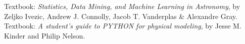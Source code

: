 \documentclass[oneside,a4paper,12pt]{article}
\begin{document}
	\begin{thebibliography}{}
	\bibitem{}
	\noindent Textbook: \emph{Statistics, Data Mining, and Machine Learning in Astronomy}, by Zeljko Ivezic, Andrew J. Connolly, Jacob T. Vanderplas & Alexandre Gray. \\
    \noindent Textbook: \emph{A student's guide to PYTHON for physical modeling}, by Jesse M. Kinder and Philip Nelson. \\

	

	\bibitem{}
	
	\end{thebibliography}
		
	
\end{document}
